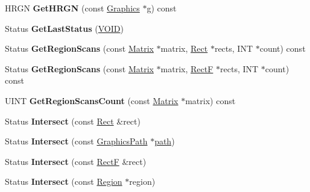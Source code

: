 \begin{DoxyCompactItemize}
\mbox{\label{class_region_a7c67c70a452c75dd2747ead1c80b302b}} 
H\+R\+GN {\bfseries Get\+H\+R\+GN} (const \hyperlink{class_graphics}{Graphics} $\ast$g) const
\item 
\mbox{\label{class_region_a4a5884bde938713be227ec36b8b4dca8}} 
Status {\bfseries Get\+Last\+Status} (\hyperlink{interfacevoid}{V\+O\+ID})
\item 
\mbox{\label{class_region_a9a22d1261dec5d897ea32c49a274e621}} 
Status {\bfseries Get\+Region\+Scans} (const \hyperlink{class_matrix}{Matrix} $\ast$matrix, \hyperlink{struct_rect}{Rect} $\ast$rects, I\+NT $\ast$count) const
\item 
\mbox{\label{class_region_a0f1e2be9e334d141b2b5fc5b5de1e968}} 
Status {\bfseries Get\+Region\+Scans} (const \hyperlink{class_matrix}{Matrix} $\ast$matrix, \hyperlink{struct_rect_f}{RectF} $\ast$rects, I\+NT $\ast$count) const
\item 
\mbox{\label{class_region_accb4eb2461b2db13a959b3339ddc3cf5}} 
U\+I\+NT {\bfseries Get\+Region\+Scans\+Count} (const \hyperlink{class_matrix}{Matrix} $\ast$matrix) const
\item 
\mbox{\label{class_region_aa6c3a43c4edbfec5cb5ffd9d53e14e4a}} 
Status {\bfseries Intersect} (const \hyperlink{struct_rect}{Rect} \&rect)
\item 
\mbox{\label{class_region_a227b68c33e91b5218b2864ef2850e559}} 
Status {\bfseries Intersect} (const \hyperlink{class_graphics_path}{Graphics\+Path} $\ast$\hyperlink{structpath}{path})
\item 
\mbox{\label{class_region_a9f62d82ec28d020808b7afffbee3d27c}} 
Status {\bfseries Intersect} (const \hyperlink{struct_rect_f}{RectF} \&rect)
\item 
\mbox{\label{class_region_a9425ccaf6cc652c34ee65cd3b1526507}} 
Status {\bfseries Intersect} (const \hyperlink{class_region}{Region} $\ast$region)
\item 
\mbox{\label{class_region_a9afa978cb96eb7a5835afcf4c218d5b3}} 

\end{DoxyCompactItemize}
